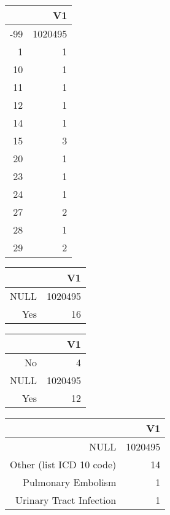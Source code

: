 \bigskip\bigskip
\centering
\begin{tabular}{rr}
  \hline
 & V1 \\ 
  \hline
-99 & 1020495 \\ 
  1 &   1 \\ 
  10 &   1 \\ 
  11 &   1 \\ 
  12 &   1 \\ 
  14 &   1 \\ 
  15 &   3 \\ 
  20 &   1 \\ 
  23 &   1 \\ 
  24 &   1 \\ 
  27 &   2 \\ 
  28 &   1 \\ 
  29 &   2 \\ 
   \hline
\end{tabular}

\bigskip\bigskip
\centering
\begin{tabular}{rr}
  \hline
 & V1 \\ 
  \hline
NULL & 1020495 \\ 
  Yes &  16 \\ 
   \hline
\end{tabular}

\bigskip\bigskip
\centering
\begin{tabular}{rr}
  \hline
 & V1 \\ 
  \hline
No &   4 \\ 
  NULL & 1020495 \\ 
  Yes &  12 \\ 
   \hline
\end{tabular}

\bigskip\bigskip
\centering
\begin{tabular}{rr}
  \hline
 & V1 \\ 
  \hline
NULL & 1020495 \\ 
  Other (list ICD 10 code) &  14 \\ 
  Pulmonary Embolism &   1 \\ 
  Urinary Tract Infection &   1 \\ 
   \hline
\end{tabular}

